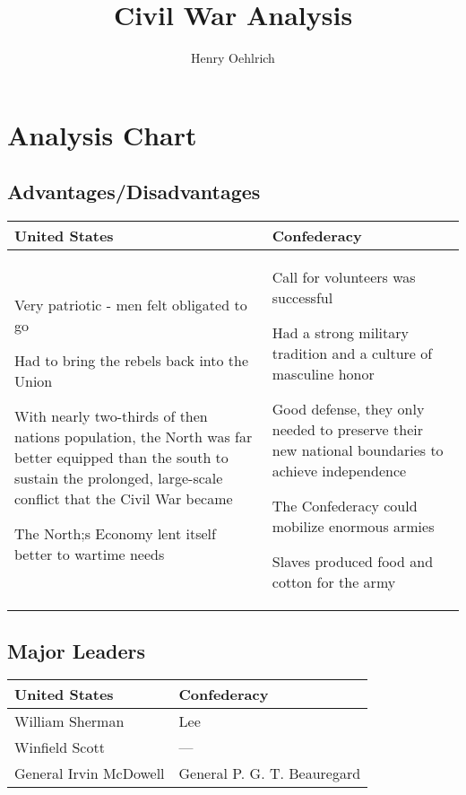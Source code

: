 \documentclass{article}
\title{Civil War Analysis}
\author{Henry Oehlrich}
\begin{document}
\maketitle

\section{Analysis Chart}
\subsection{Advantages/Disadvantages}
\begin{tabular}{|p{7cm}|p{7cm}|}
    \hline
    United States & Confederacy \\
    \hline
    Very patriotic - men felt obligated to go

    Had to bring the rebels back into the Union

    With nearly two-thirds of then nations population, the North was far better
    equipped than the south to sustain the prolonged, large-scale conflict
    that the Civil War became

    The North;s Economy lent itself better to wartime needs
    &
    Call for volunteers was successful

    Had a strong military tradition and a culture of masculine honor

    Good defense, they only needed to preserve their new national boundaries to
    achieve independence
    
    The Confederacy could mobilize enormous armies

    Slaves produced food and cotton for the army
    \\
    \hline
\end{tabular}

\subsection{Major Leaders}
\begin{tabular}{|p{7cm}|p{7cm}|}
    \hline
    United States & Confederacy \\
    \hline
    William Sherman
    &
    Lee
    \\
    \hline
    Winfield Scott
    &
    ---
    \\
    \hline
    General Irvin McDowell
    &
    General P. G. T. Beauregard
    \\
    \hline
\end{tabular}
\end{document}
